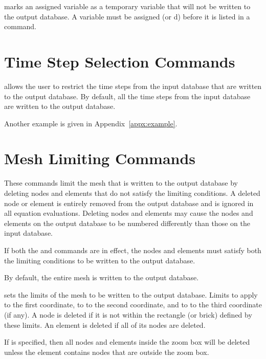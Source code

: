 \newpage %
 {
 marks an assigned variable as a temporary variable that
will not be written to the output database. A variable must be assigned
(or d) before it is listed in a  command.
}

\newpage
\section{Time Step Selection Commands} \label{cmd:timesel}

\caps{\PROGRAM} allows the user to restrict the time steps from the
input database that are written to the output database. By default, all
the time steps from the input database are written to the output
database.









Another example is given in Appendix~\ref{appx:example}.

\newpage
\section{Mesh Limiting Commands} \label{cmd:meshlimit}

These commands limit the mesh that is written to the output database by
deleting nodes and elements that do not satisfy the limiting conditions.
A deleted node or element is entirely removed from the output database
and is ignored in all equation evaluations. Deleting nodes and elements
may cause the nodes and elements on the output database to be numbered
differently than those on the input database.

If both the  and  commands are in effect, the
nodes and elements must satisfy both the limiting conditions to be
written to the output database.

By default, the entire mesh is written to the output database.

 {
 sets the limits of the mesh to be written to the output
database. Limits  to  apply to the first
coordinate,  to  to the second coordinate, and
 to  to the third coordinate (if any). A node is
deleted if it is not within the rectangle (or brick) defined by these
limits. An element is deleted if all of its nodes are deleted.

If  is specified, then all nodes and elements inside the
zoom box will be deleted unless the element contains nodes that are
outside the zoom box.
}

